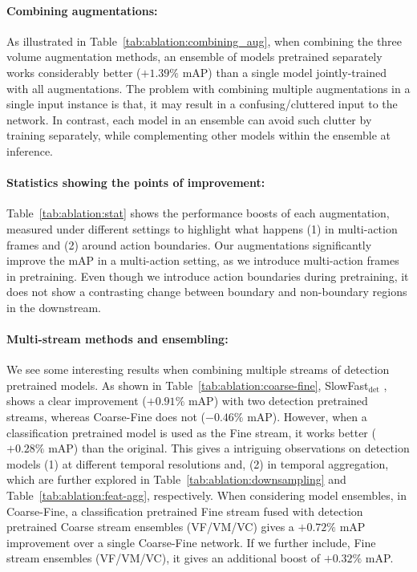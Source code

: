 \documentclass[10pt,twocolumn,letterpaper]{article}
\newcommand{\tref}[1]{Table~\ref{#1}}
\begin{document}
\vspace{-1mm}
\paragraph{Combining augmentations:} As illustrated in \tref{tab:ablation:combining_aug}, when combining the three volume augmentation methods, an ensemble of models pretrained separately works considerably better ($+1.39\%$ mAP) than a single model jointly-trained with all augmentations. The problem with combining multiple augmentations in a single input instance is that, it may result in a confusing/cluttered input to the network. In contrast, each model in an ensemble can avoid such clutter by training separately, while complementing other models within the ensemble at inference.

\vspace{-1.0mm}
\paragraph{Statistics showing the points of improvement:} \tref{tab:ablation:stat} shows the performance boosts of each augmentation, measured under different settings to highlight what happens (1) in multi-action frames and (2) around action boundaries. Our augmentations significantly improve the mAP in a multi-action setting, as we introduce multi-action frames in pretraining. Even though we introduce action boundaries during pretraining, it does not show a contrasting change between boundary and non-boundary regions in the downstream.

\vspace{-1.0mm}
\paragraph{Multi-stream methods and ensembling:} We see some interesting results when combining multiple streams of detection pretrained models. As shown in \tref{tab:ablation:coarse-fine}, SlowFast$_\text{det}$ \cite{feichtenhofer2019slowfast}, shows a clear improvement ($+0.91\%$ mAP) with two detection pretrained streams, whereas Coarse-Fine \cite{kahatapitiya2021coarse} does not ($-0.46\%$ mAP). However, when a classification pretrained model is used as the Fine stream, it works better ($+0.28\%$ mAP) than the original. This gives a intriguing observations on detection models (1) at different temporal resolutions and, (2) in temporal aggregation, which are further explored in \tref{tab:ablation:downsampling} and \tref{tab:ablation:feat-agg}, respectively. When considering model ensembles, in Coarse-Fine, a classification pretrained Fine stream fused with detection pretrained Coarse stream ensembles (VF/VM/VC) gives a $+0.72\%$ mAP improvement over a single Coarse-Fine network. If we further include, Fine stream ensembles (VF/VM/VC), it gives an additional boost of $+0.32\%$ mAP.
\end{document}
